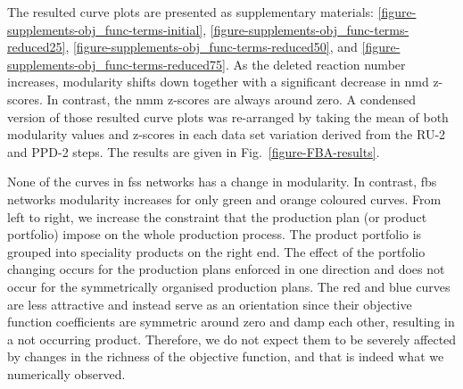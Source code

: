 The resulted curve plots are presented as supplementary materials: \ref{figure-supplements-obj_func-terms-initial}, \ref{figure-supplements-obj_func-terms-reduced25}, \ref{figure-supplements-obj_func-terms-reduced50}, and \ref{figure-supplements-obj_func-terms-reduced75}. As the deleted reaction number increases, modularity shifts down together with a significant decrease in \acs{nmd} z-scores. In contrast, the \acs{nmm} z-scores are always around zero. A condensed version of those resulted curve plots was re-arranged by taking the mean of both modularity values and z-scores in each data set variation derived from the RU-2 and PPD-2 steps. The results are given in Fig.~\ref{figure-FBA-results}.

None of the curves in \acs{fss} networks has a change in modularity. In contrast, \acs{fbs} networks modularity increases for only green and orange coloured curves. From left to right, we increase the constraint that the production plan (or product portfolio) impose on the whole production process. The product portfolio is grouped into speciality products on the right end. The effect of the portfolio changing occurs for the production plans enforced in one direction and does not occur for the symmetrically organised production plans. The red and blue curves are less attractive and instead serve as an orientation since their objective function coefficients are symmetric around zero and damp each other, resulting in a not occurring product. Therefore, we do not expect them to be severely affected by changes in the richness of the objective function, and that is indeed what we numerically observed.



